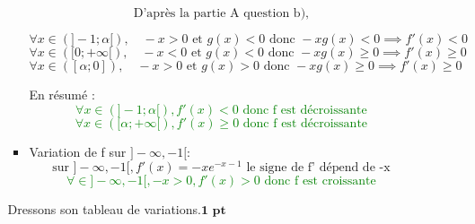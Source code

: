 \documentclass[12pt]{article}
\begin{document}
\begin{enumerate}
\begin{enumerate}
\begin{itemize}
\[\text{D'après la partie A question b), }\]

\[ \forall x \in \left( ]-1;\alpha[\right),\quad -x>0 \text{ et } g(x)<0 \text{ donc } -xg(x)<0\implies f'(x)<0\]
\[ \forall x \in \left( [0;+\infty[\right),\quad -x<0 \text{ et } g(x)<0 \text{ donc } -xg(x)\geq 0\implies f'(x)\geq 0\]
\[ \forall x \in \left( [\alpha;0]\right),\quad -x>0 \text{ et } g(x)>0 \text{ donc } -xg(x)\geq 0\implies f'(x)\geq 0\]

En résumé :
\textcolor{green}{
\[ \forall x \in \left( ]-1;\alpha[ \right), f'(x) < 0 \text{ donc f est décroissante }\]
\[ \forall x \in \left( [\alpha;+\infty[ \right)  , f'(x) \geq 0 \text{ donc f est décroissante      }\]
}
\item Variation de f sur $]-\infty, -1[$:
\[\text{sur } ]-\infty, -1[,f'(x)=-xe^{-x-1} \text{ le signe de f' dépend de -x } \]
\textcolor{green}{
\[\forall \in  ]-\infty, -1[, -x>0, f'(x)>0 \text{ donc f est croissante }\]
}
\end{itemize}
Dressons son tableau de variations.$\textbf{1 pt}$

\end{enumerate}
\end{enumerate}
\end{document}
